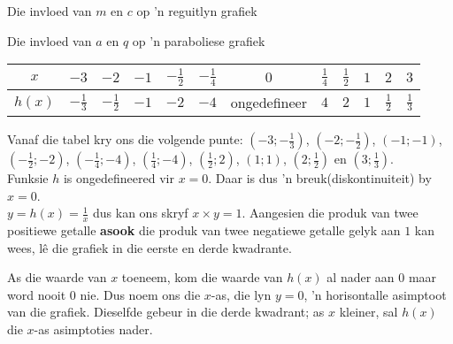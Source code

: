 \begin{Ondersoek}{Die invloed van $m$ en $c$ op 'n reguitlyn grafiek}
\begin{Ondersoek}{Die invloed van $a$ en $q$ op 'n paraboliese grafiek}
\begin{wex}
{{\begin{table}[H]
\begin{center}
\begin{tabular}{|c|c|c|c|c|c|c|c|c|c|c|c|}
\hline
  $x$ &  $-3$ & $-2$ & $-1$ & $-\frac{1}{2}$ & $-\frac{1}{4}$ &$0$&$\frac{1}{4}$&$\frac{1}{2}$&$1$&$2$&$3$
\\ \hline
 $h(x)$& $-\frac{1}{3}$ &$-\frac{1}{2}$&$-1$&$-2$&$-4$&ongedefineer&$4$&$2$&$1$&$\frac{1}{2}$&$\frac{1}{3}$
\\ \hline
\end{tabular}
\end{center}
\end{table}
}
Vanaf die tabel kry ons die volgende punte: $(-3; -\frac{1}{3})$, $(-2; -\frac{1}{2})$, $(-1;-1)$, $(-\frac{1}{2}; -2)$, $(-\frac{1}{4}; -4)$, $(\frac{1}{4}; -4)$, $(\frac{1}{2}; 2)$, $(1; 1)$, $(2; \frac{1}{2})$ en $(3; \frac{1}{3})$. \vspace{8pt} \\




Funksie $h$ is ongedefineered vir $x=0$. Daar is dus 'n breuk(diskontinuiteit) by $x=0$. \vspace{8pt} \\
$y=h(x) = \frac{1}{x}$ dus kan ons skryf $x \times y = 1$. Aangesien die produk van twee positiewe getalle \textbf{asook} die produk van twee negatiewe getalle gelyk aan $1$ kan wees, l\^e die grafiek in die eerste en derde kwadrante.

As die waarde van $x$ toeneem, kom die waarde van $h(x)$ al nader aan $0$ maar word nooit $0$ nie. Dus noem ons die $x$-as, die lyn $y=0$, 'n horisontalle asimptoot van die grafiek. Dieselfde gebeur in die derde kwadrant; as $x$ kleiner, sal $h(x)$ die $x$-as asimptoties nader.\vspace{8pt} \\

}
\end{wex}
\end{Ondersoek}
\end{Ondersoek}
